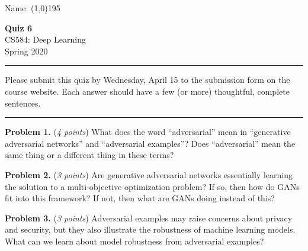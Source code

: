 \documentclass[12pt]{article}
\newcommand{\hzline}{\bigskip\hrule\medskip}
\begin{document}
Name: \line(1,0){195}\\

\begin{center}
\textbf{Quiz 6}\\
CS584: Deep Learning\\
Spring 2020
\end{center}

\hzline

Please submit this quiz by Wednesday, April 15 to the submission form on the course website. Each answer should have a few (or more) thoughtful, complete sentences.

\hzline

\textbf{Problem 1.} (\emph{4 points})
What does the word ``adversarial'' mean in ``generative adversarial networks'' and ``adversarial examples''? Does ``adversarial'' mean the same thing or a different thing in these terms?

\vspace{1.67in}

\textbf{Problem 2.} (\emph{3 points})
Are generative adversarial networks essentially learning the solution to a multi-objective optimization problem? If so, then how do GANs fit into this framework? If not, then what are GANs doing instead of this?

\vspace{1.67in}

\textbf{Problem 3.} (\emph{3 points})
Adversarial examples may raise concerns about privacy and security, but they also illustrate the robustness of machine learning models. What can we learn about model robustness from adversarial examples?

\vspace{1.67in}
\end{document}
